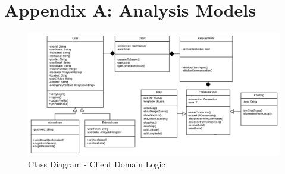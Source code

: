 \documentclass{scrreprt}
\begin{document}



\chapter{Appendix A: Analysis Models}



    
\clearpage


\begin{figure}[ht!]
    \centering
    \includegraphics[angle=90, height=.92\textheight]{img3/ClassDiagram1.pdf}
    \caption{Class Diagram - Client Domain Logic}
    \label{fig:classdig1}
\end{figure}
\end{document}
